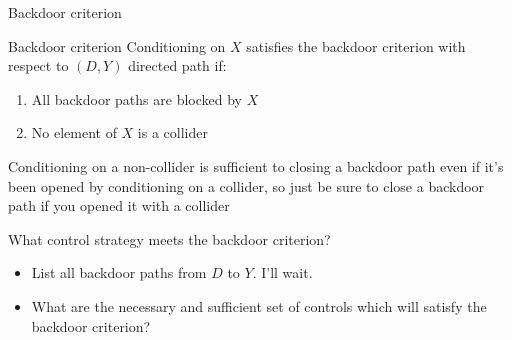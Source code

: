 \begin{frame}{Backdoor criterion}


  \begin{block}{Backdoor criterion}
    Conditioning on $X$ satisfies the backdoor criterion with respect to $(D,Y)$ directed path if:
    \begin{enumerate}
      \item All backdoor paths are blocked by $X$
      \item No element of $X$ is a collider

    \end{enumerate}

    
  \end{block}
       Conditioning on a non-collider is sufficient to closing a backdoor path even if it's been opened by conditioning on a collider, so just be sure to close a backdoor path if you opened it with a collider


\end{frame}

\begin{frame}{What control strategy meets the backdoor criterion?}
  \begin{itemize}
    \item List all backdoor paths from $D$ to $Y$. I'll wait.

          \begin{center}
          \end{center}

    \item What are the necessary and sufficient set of controls which will satisfy the backdoor criterion?
  \end{itemize}

  \framebreak




\end{frame}


